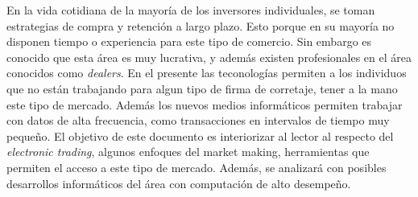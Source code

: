 En la vida cotidiana de la mayoría de los inversores individuales, se toman estrategias de compra y retención a largo plazo. Esto porque en su mayoría
no disponen tiempo o experiencia para este tipo de comercio. Sin embargo es conocido que esta área es muy lucrativa, y además existen profesionales en el área
conocidos como \emph{dealers}. En el presente las teconologías permiten a los individuos que no están trabajando para algun tipo de firma de corretaje, tener a la
mano este tipo de mercado. Además los nuevos medios informáticos permiten trabajar con datos de alta frecuencia, como transacciones en intervalos de tiempo muy pequeño.
El objetivo de este documento es interiorizar al lector al respecto del \emph{electronic trading}, algunos enfoques del market making, herramientas que permiten el 
acceso a este tipo de mercado. Además, se analizará con posibles desarrollos informáticos del área con computación de alto desempeño.
